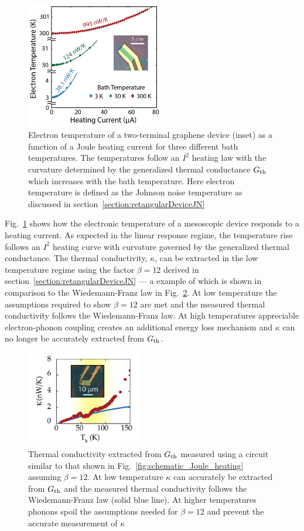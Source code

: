 \begin{figure}
\centering
\includegraphics[width=60mm]{figures/thermal_via_noise/quadratic_Joule_heating.png}
\caption{Electron temperature of a two-terminal graphene device (inset) as a function of a Joule heating current for three different bath temperatures. The temperatures follow an $I^2$ heating law with the curvature determined by the generalized thermal conductance $G_{\mathrm{th}}$ which increases with the bath temperature. Here electron temperature is defined as the Johnson noise temperature as discussed in section~\ref{section:retangularDeviceJN}}
\label{fig:quadratic_Joule_heating}
\end{figure}
Fig.~\ref{fig:quadratic_Joule_heating} shows how the electronic temperature of a mesoscopic device responds to a heating current. As expected in the linear response regime, the temperature rise follows an $I^2$ heating curve with curvature governed by the generalized thermal conductance. The thermal conductivity, $\kappa$, can be extracted in the low temperature regime using the factor $\beta = 12$ derived in section~\ref{section:retangularDeviceJN} --- a example of which is shown in comparison to the Wiedemann-Franz law in Fig.~\ref{fig:examplekappa}. At low temperature the assumptions required to show $\beta = 12$ are met and the measured thermal conductivity follows the Wiedemann-Franz law. At high temperatures appreciable electron-phonon coupling creates an additional energy loss mechanism and $\kappa$ can no longer be accurately extracted from $G_{\mathrm{th}}$.
\begin{figure}
\centering
\includegraphics[width=50mm]{figures/thermal_via_noise/kappa.png}
\caption{Thermal conductivity extracted from $G_{\mathrm{th}}$ measured using a circuit similar to that shown in Fig.~\ref{fig:schematic_Joule_heating} assuming $\beta = 12$. At low temperature $\kappa$ can accurately be extracted from $G_{\mathrm{th}}$ and the measured thermal conductivity follows the Wiedemann-Franz law (solid blue line). At higher temperatures phonons spoil the assumptions needed for $\beta = 12$ and prevent the accurate measurement of $\kappa$}
\label{fig:examplekappa}
\end{figure}